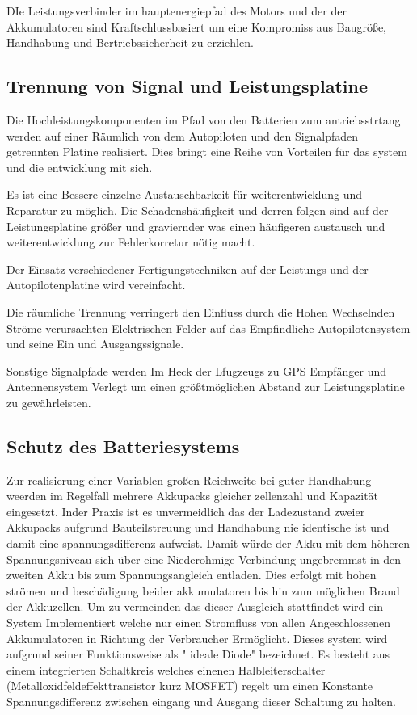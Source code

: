 DIe Leistungsverbinder im hauptenergiepfad des Motors und der der Akkumulatoren sind Kraftschlussbasiert um eine Kompromiss aus Baugröße, Handhabung und Bertriebssicherheit zu erziehlen.

\subsection{Trennung von Signal und Leistungsplatine}

Die  Hochleistungskomponenten im Pfad von den Batterien zum antriebsstrtang werden auf einer Räumlich von dem Autopiloten und den Signalpfaden getrennten Platine realisiert. Dies bringt eine Reihe von Vorteilen für das system und die entwicklung mit sich.

Es ist eine Bessere einzelne Austauschbarkeit für weiterentwicklung und Reparatur zu möglich.
Die Schadenshäufigkeit und derren folgen sind auf der Leistungsplatine größer und graviernder was einen häufigeren 
austausch und weiterentwicklung zur Fehlerkorretur nötig macht.

Der Einsatz verschiedener Fertigungstechniken auf der Leistungs und der Autopilotenplatine wird vereinfacht.

Die räumliche Trennung verringert den Einfluss durch die Hohen Wechselnden Ströme verursachten Elektrischen Felder auf das Empfindliche Autopilotensystem und seine Ein und Ausgangssignale.

Sonstige Signalpfade werden Im Heck der Lfugzeugs zu GPS Empfänger und Antennensystem Verlegt um einen größtmöglichen Abstand zur Leistungsplatine zu gewährleisten.

\subsection{Schutz des Batteriesystems}

Zur realisierung einer Variablen großen Reichweite bei guter Handhabung weerden im Regelfall mehrere Akkupacks gleicher zellenzahl und Kapazität eingesetzt.
Inder Praxis ist es unvermeidlich das der Ladezustand zweier Akkupacks aufgrund Bauteilstreuung und Handhabung nie identische ist und damit eine spannungsdifferenz aufweist. Damit würde der Akku mit dem höheren Spannungsniveau sich über eine Niederohmige Verbindung ungebremmst in den zweiten Akku bis zum Spannungsangleich entladen. Dies erfolgt mit  hohen strömen und beschädigung beider akkumulatoren bis hin zum möglichen Brand der Akkuzellen.
Um zu vermeinden das dieser Ausgleich stattfindet wird ein System Implementiert welche nur einen Stromfluss von allen Angeschlossenen Akkumulatoren in Richtung der Verbraucher Ermöglicht.
Dieses system wird aufgrund seiner Funktionsweise als " ideale Diode" bezeichnet. Es besteht aus einem integrierten Schaltkreis welches einenen Halbleiterschalter (Metalloxidfeldeffekttransistor kurz MOSFET) regelt um einen Konstante Spannungsdifferenz zwischen eingang und Ausgang dieser Schaltung zu halten.

